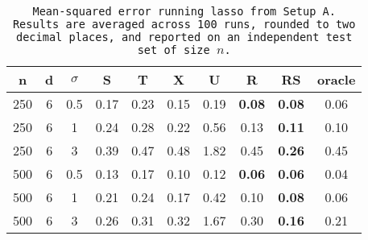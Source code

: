 \begin{table}[ht]
\centering
\begin{tabular}{cccccccccc}
  \hline
n & d & $\sigma$ & S & T & X & U & R & RS & oracle \\ 
  \hline
250 & 6 & 0.5 & 0.17 & 0.23 & 0.15 & 0.19 & \bf 0.08 & \bf 0.08 & 0.06 \\ 
  250 & 6 & 1 & 0.24 & 0.28 & 0.22 & 0.56 & 0.13 & \bf 0.11 & 0.10 \\ 
  250 & 6 & 3 & 0.39 & 0.47 & 0.48 & 1.82 & 0.45 & \bf 0.26 & 0.45 \\ 
  500 & 6 & 0.5 & 0.13 & 0.17 & 0.10 & 0.12 & \bf 0.06 & \bf 0.06 & 0.04 \\ 
  500 & 6 & 1 & 0.21 & 0.24 & 0.17 & 0.42 & 0.10 & \bf 0.08 & 0.06 \\ 
  500 & 6 & 3 & 0.26 & 0.31 & 0.32 & 1.67 & 0.30 & \bf 0.16 & 0.21 \\ 
   \hline
\end{tabular}
\caption{\tt Mean-squared error running \texttt{lasso} from Setup A. Results are averaged across 100 runs, rounded to two decimal places, and reported on an independent test set of size $n$.} 
\label{table:setup1}
\end{table}
